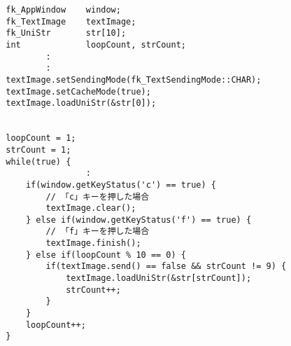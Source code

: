 \begin{breakbox}
\begin{verbatim}
        fk_AppWindow    window;
        fk_TextImage    textImage;
        fk_UniStr       str[10];
        int             loopCount, strCount;
                :
                :
        textImage.setSendingMode(fk_TextSendingMode::CHAR);
        textImage.setCacheMode(true);
        textImage.loadUniStr(&str[0]);


        loopCount = 1;
        strCount = 1;
        while(true) {
                        :
            if(window.getKeyStatus('c') == true) {
                // 「c」キーを押した場合
                textImage.clear();
            } else if(window.getKeyStatus('f') == true) {
                // 「f」キーを押した場合
                textImage.finish();
            } else if(loopCount % 10 == 0) {
                if(textImage.send() == false && strCount != 9) {
                    textImage.loadUniStr(&str[strCount]);
                    strCount++;
                }
            }
            loopCount++;
        }
\end{verbatim}
\end{breakbox}

